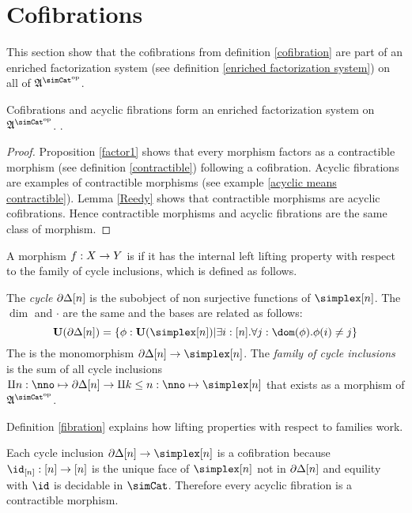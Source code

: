 \documentclass[csh.tex]{subfiles}
\begin{document}
\section{Cofibrations}
This section show that the cofibrations from definition \ref{cofibration} are part of an enriched factorization system (see definition \ref{enriched factorization system}) on all of $\ambient\s$.

\begin{lemma} Cofibrations and acyclic fibrations form an enriched factorization system on $\ambient\s$. \label{factorization system 1}. \end{lemma}

\begin{proof} Proposition \ref{factor1} shows that every morphism factors as a contractible morphism (see definition \ref{contractible}) following a cofibration. Acyclic fibrations are examples of contractible morphisms (see example \ref{acyclic means contractible}). Lemma \ref{Reedy} shows that contractible morphisms are acyclic cofibrations. Hence contractible morphisms and acyclic fibrations are the same class of morphism.
\end{proof}

\begin{definition} A morphism $f: X\to Y$ is  if it has the internal left lifting property with respect to the family of cycle inclusions, which is defined as follows.

The \emph{cycle} $\partial\Delta[n]$ is the subobject of non surjective functions of $\simplex[n]$. The $\dim$ and $\cdot$ are the same and the bases are related as follows:
\[ \base(\cycle[n]) = \set{\phi\of\base(\simplex[n])| \exists i\of[n].\forall j\of \dom(\phi).\phi(i)\neq j } \]
The  is the monomorphism $\cycle[n]\to\simplex[n]$. The \emph{family of cycle inclusions} is the sum of all cycle inclusions $\coproduct{n\of\nno}{\cycle[n]}\to \coproduct{k\leq n\of\nno}{\simplex[n]}$ that exists as a morphism of $\ambient\s$.

Definition \ref{fibration} explains how lifting properties with respect to families work.
\end{definition}

\begin{example} Each cycle inclusion $\cycle[n]\to\simplex[n]$ is a cofibration because $\id_{[n]}\of[n]\to[n]$ is the unique face of $\simplex[n]$ not in $\partial\Delta[n]$ and equility with $\id$ is decidable in $\simCat$. Therefore every acyclic fibration is a contractible morphism. \label{acyclic means contractible}\end{example}
\end{document}
